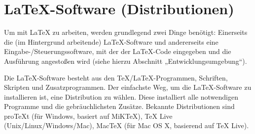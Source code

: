 \section{LaTeX-Software (Distributionen)}

Um mit LaTeX zu arbeiten, werden grundlegend zwei Dinge benötigt: Einerseits die (im Hintergrund arbeitende) LaTeX-Software und andererseits eine Eingabe-/Steuerungssoftware, mit der der LaTeX-Code eingegeben und die Ausführung angestoßen wird (siehe hierzu Abschnitt „Entwicklungsumgebung“).

Die LaTeX-Software besteht aus den TeX/LaTeX-Programmen, Schriften, Skripten und Zusatzprogrammen. Der einfachste Weg, um die LaTeX-Software zu installieren ist, eine Distribution zu wählen. Diese installiert alle notwendigen Programme und die gebräuchlichsten Zusätze. Bekannte Distributionen sind proTeXt (für Windows, basiert auf MiKTeX), TeX Live (Unix/Linux/Windows/Mac), MacTeX (für Mac OS X, basierend auf TeX Live).